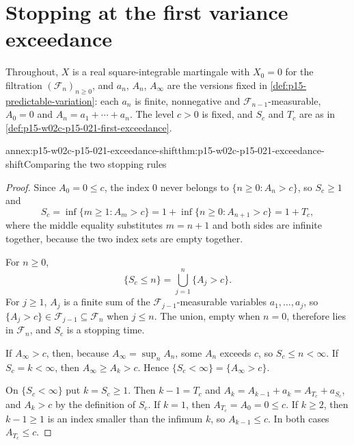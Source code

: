 \section{Stopping at the first variance exceedance}
\label{sec:annex-p15-w02c-p15-021-first-exceedance}

Throughout, \(X\) is a real square-integrable martingale with
\(X_0=0\) for the filtration \((\mathcal F_n)_{n\geq0}\), and
\(a_n\), \(A_n\), \(A_\infty\) are the versions fixed in
\cref{def:p15-predictable-variation}: each \(a_n\) is finite,
nonnegative and \(\mathcal F_{n-1}\)-measurable, \(A_0=0\) and
\(A_n=a_1+\cdots+a_n\). The level \(c>0\) is fixed, and \(S_c\) and
\(T_c\) are as in \cref{def:p15-w02c-p15-021-first-exceedance}.

\begin{annexitem}{annex:p15-w02c-p15-021-exceedance-shift}{thm:p15-w02c-p15-021-exceedance-shift}{Comparing the two stopping rules}
\begin{proof}
Since \(A_0=0\leq c\), the index \(0\) never belongs to
\(\{n\geq0:A_n>c\}\), so \(S_c\geq1\) and
\[
 S_c=\inf\{m\geq1:A_m>c\}
    =1+\inf\{n\geq0:A_{n+1}>c\}
    =1+T_c,
\]
where the middle equality substitutes \(m=n+1\) and both sides are
infinite together, because the two index sets are empty together.

For \(n\geq0\),
\[
 \{S_c\leq n\}=\bigcup_{j=1}^n\{A_j>c\}.
\]
For \(j\geq1\), \(A_j\) is a finite sum of the
\(\mathcal F_{j-1}\)-measurable variables \(a_1,\ldots,a_j\), so
\(\{A_j>c\}\in\mathcal F_{j-1}\subseteq\mathcal F_n\) when \(j\leq n\).
The union, empty when \(n=0\), therefore lies in \(\mathcal F_n\), and
\(S_c\) is a stopping time.

If \(A_\infty>c\), then, because \(A_\infty=\sup_nA_n\), some \(A_n\)
exceeds \(c\), so \(S_c\leq n<\infty\). If \(S_c=k<\infty\), then
\(A_\infty\geq A_k>c\). Hence \(\{S_c<\infty\}=\{A_\infty>c\}\).

On \(\{S_c<\infty\}\) put \(k=S_c\geq1\). Then \(k-1=T_c\) and
\(A_k=A_{k-1}+a_k=A_{T_c}+a_{S_c}\), and \(A_k>c\) by the definition of
\(S_c\). If \(k=1\), then \(A_{T_c}=A_0=0\leq c\). If \(k\geq2\), then
\(k-1\geq1\) is an index smaller than the infimum \(k\), so
\(A_{k-1}\leq c\). In both cases \(A_{T_c}\leq c\).
\end{proof}
\end{annexitem}

